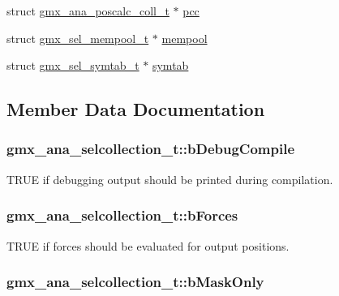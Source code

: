 \begin{DoxyCompactItemize}
\item 
struct \hyperlink{structgmx__ana__poscalc__coll__t}{gmx\-\_\-ana\-\_\-poscalc\-\_\-coll\-\_\-t} $\ast$ \hyperlink{structgmx__ana__selcollection__t_a06323c0a4407a965e4b9ae1b5a983421}{pcc}
\item 
struct \hyperlink{structgmx__sel__mempool__t}{gmx\-\_\-sel\-\_\-mempool\-\_\-t} $\ast$ \hyperlink{structgmx__ana__selcollection__t_ab4448df8389544f331a757c675b151d7}{mempool}
\item 
struct \hyperlink{structgmx__sel__symtab__t}{gmx\-\_\-sel\-\_\-symtab\-\_\-t} $\ast$ \hyperlink{structgmx__ana__selcollection__t_afeae6eb7bc1ee037209268cbfbcff052}{symtab}
\end{DoxyCompactItemize}


\subsection{\-Member \-Data \-Documentation}
\hypertarget{structgmx__ana__selcollection__t_ae40b954701fd04a678ab7e4303351439}{
\subsubsection[{b\-Debug\-Compile}]{ {\bf gmx\-\_\-ana\-\_\-selcollection\-\_\-t\-::b\-Debug\-Compile}}}\label{structgmx__ana__selcollection__t_ae40b954701fd04a678ab7e4303351439}
\-T\-R\-U\-E if debugging output should be printed during compilation. \hypertarget{structgmx__ana__selcollection__t_aeb63f6c0d45e2384f18f5037f5eca1de}{
\subsubsection[{b\-Forces}]{ {\bf gmx\-\_\-ana\-\_\-selcollection\-\_\-t\-::b\-Forces}}}\label{structgmx__ana__selcollection__t_aeb63f6c0d45e2384f18f5037f5eca1de}
\-T\-R\-U\-E if forces should be evaluated for output positions. \hypertarget{structgmx__ana__selcollection__t_a93b850e091026d957f521ffc01df5442}{
\subsubsection[{b\-Mask\-Only}]{ {\bf gmx\-\_\-ana\-\_\-selcollection\-\_\-t\-::b\-Mask\-Only}}}\label{structgmx__ana__selcollection__t_a93b850e091026d957f521ffc01df5442}
